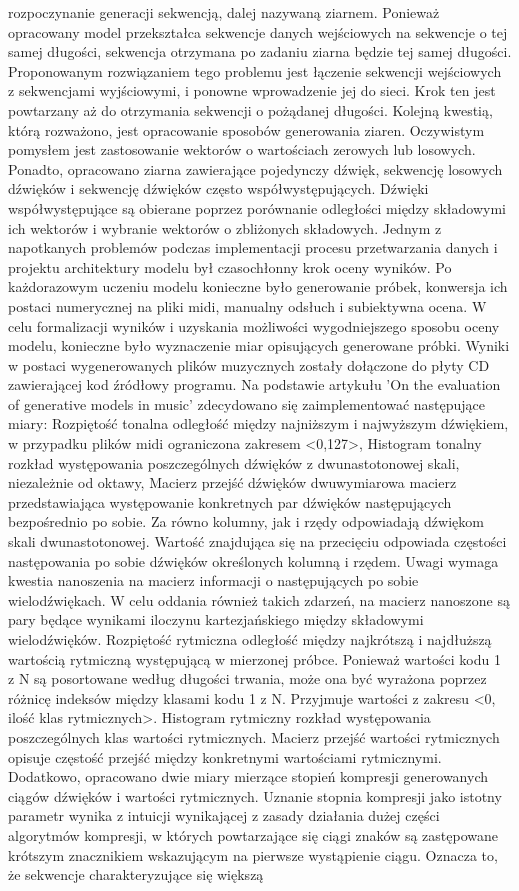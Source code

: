 rozpoczynanie generacji sekwencją, dalej nazywaną ziarnem.  Ponieważ opracowany model przekształca sekwencje danych wejściowych na sekwencje o tej samej długości, sekwencja otrzymana po zadaniu ziarna będzie tej samej długości. Proponowanym rozwiązaniem tego problemu jest łączenie sekwencji wejściowych z sekwencjami wyjściowymi, i ponowne wprowadzenie jej do sieci. Krok ten jest powtarzany aż do otrzymania sekwencji o pożądanej długości. Kolejną kwestią, którą rozważono, jest opracowanie sposobów generowania ziaren. Oczywistym pomysłem jest zastosowanie wektorów o wartościach zerowych lub losowych. Ponadto, opracowano ziarna zawierające pojedynczy dźwięk, sekwencję losowych dźwięków i sekwencję dźwięków często współwystępujących. Dźwięki współwystępujące są obierane poprzez porównanie odległości między składowymi ich wektorów i wybranie wektorów o zbliżonych składowych. Jednym z napotkanych problemów podczas implementacji procesu przetwarzania danych i projektu architektury modelu był czasochłonny krok oceny wyników. Po każdorazowym uczeniu modelu konieczne było generowanie próbek,  konwersja ich postaci numerycznej na pliki midi, manualny odsłuch i subiektywna ocena. W celu formalizacji wyników i uzyskania możliwości wygodniejszego sposobu oceny modelu, konieczne było wyznaczenie miar opisujących generowane próbki.  Wyniki w postaci wygenerowanych plików muzycznych zostały dołączone do płyty CD zawierającej kod źródłowy programu. Na podstawie artykułu 'On the evaluation of generative models in music' zdecydowano się zaimplementować następujące miary:  Rozpiętość tonalna  odległość między najniższym i najwyższym dźwiękiem, w przypadku plików midi ograniczona zakresem <0,127>,  Histogram tonalny  rozkład występowania poszczególnych dźwięków z dwunastotonowej skali, niezależnie od oktawy,   Macierz przejść dźwięków  dwuwymiarowa macierz przedstawiająca występowanie konkretnych par dźwięków następujących bezpośrednio po sobie. Za równo kolumny, jak i rzędy odpowiadają dźwiękom skali dwunastotonowej.  Wartość znajdująca się na przecięciu odpowiada częstości następowania po sobie dźwięków określonych kolumną i rzędem.  Uwagi wymaga kwestia nanoszenia na macierz informacji o następujących po sobie wielodźwiękach. W celu oddania również takich zdarzeń, na macierz nanoszone są pary będące wynikami iloczynu kartezjańskiego między składowymi wielodźwięków.  Rozpiętość rytmiczna  odległość między najkrótszą i najdłuższą wartością rytmiczną występującą w mierzonej próbce.  Ponieważ wartości kodu  1\,\,z\,\,N są posortowane według długości trwania, może ona być wyrażona poprzez różnicę indeksów  między klasami kodu  1\,\,z\,\,N. Przyjmuje wartości z zakresu <0, ilość klas rytmicznych>.  Histogram rytmiczny  rozkład występowania poszczególnych klas wartości rytmicznych.  Macierz przejść wartości rytmicznych  opisuje częstość przejść między konkretnymi wartościami rytmicznymi. Dodatkowo, opracowano dwie miary mierzące stopień kompresji generowanych ciągów dźwięków i wartości rytmicznych.  Uznanie stopnia kompresji jako istotny parametr wynika z intuicji wynikającej z zasady działania dużej części algorytmów kompresji, w których powtarzające się ciągi znaków są zastępowane krótszym znacznikiem wskazującym na pierwsze  wystąpienie ciągu.  Oznacza to, że sekwencje charakteryzujące się większą 